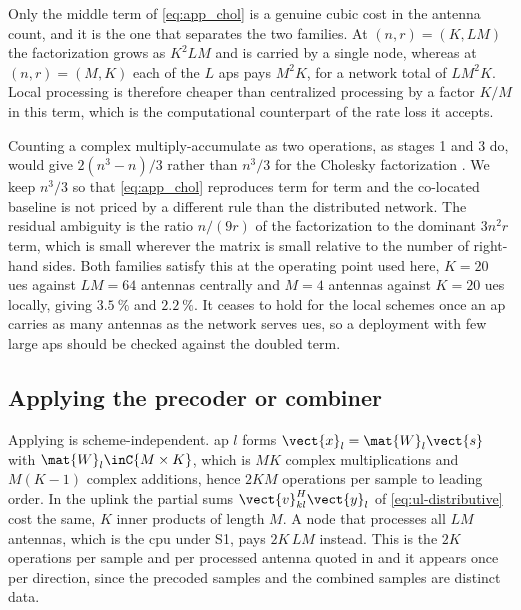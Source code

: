Only the middle term of \eqref{eq:app_chol} is a genuine cubic cost in the
antenna count, and it is the one that separates the two families. At
$(n,r)=(K,LM)$ the factorization grows as $K^{2}LM$ and is carried by a single
node, whereas at $(n,r)=(M,K)$ each of the $L$ \glspl{ap} pays $M^{2}K$, for a
network total of $LM^{2}K$. Local processing is therefore cheaper than
centralized processing by a factor $K/M$ in this term, which is the
computational counterpart of the rate loss it accepts.

\begin{remark}
\label{rem:cubic}
Counting a complex multiply-accumulate as two operations, as stages 1 and 3 do,
would give $2(n^{3}-n)/3$ rather than $n^{3}/3$ for the Cholesky factorization
\cite[App.~B.1.1]{massivemimobook}. We keep $n^{3}/3$ so that
\eqref{eq:app_chol} reproduces \cite{peschiera2026fr3} term for term and the
co-located baseline is not priced by a different rule than the distributed
network. The residual ambiguity is the ratio $n/(9r)$ of the factorization to
the dominant $3n^{2}r$ term, which is small wherever the matrix is small
relative to the number of right-hand sides. Both families satisfy this at the
operating point used here, $K=20$ \glspl{ue} against $LM=64$ antennas
centrally and $M=4$ antennas against $K=20$ \glspl{ue} locally, giving
$\SI{3.5}{\percent}$ and
$\SI{2.2}{\percent}$. It ceases to hold for the local schemes once an \gls{ap}
carries as many antennas as the network serves \glspl{ue}, so a deployment with
few large \glspl{ap} should be checked against the doubled term.
\end{remark}

\subsection{Applying the precoder or combiner}
Applying is scheme-independent. \gls{ap} $l$ forms
$\vect{x}_{l}=\mat{W}_{l}\vect{s}$ with $\mat{W}_{l}\inC{M\times K}$, which is
$MK$ complex multiplications and $M(K-1)$ complex additions, hence $2KM$
operations per sample to leading order. In the uplink the partial sums
$\vect{v}_{kl}^{H}\vect{y}_{l}$ of \eqref{eq:ul-distributive} cost the same,
$K$ inner products of length $M$. A node that processes all $LM$ antennas, which
is the \gls{cpu} under S1, pays $2K\,LM$ instead. This is the $2K$ operations
per sample and per processed antenna quoted in  and it appears
once per direction, since the precoded samples and the combined samples are
distinct data.

